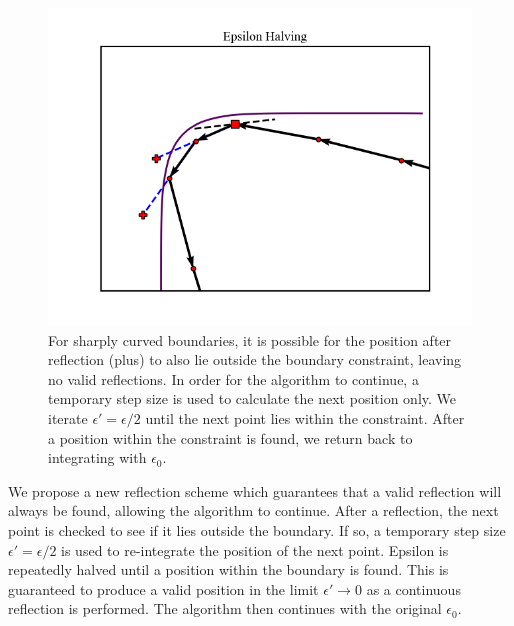 \documentclass[11pt]{article}
\begin{document}
    \begin{figure}[h!]
        \center
        \includegraphics[width=\linewidth]{../figures/EpsilonHalving}
        \caption{
        For sharply curved boundaries, it is possible for the position after reflection (plus) to also lie outside the boundary
        constraint, leaving no valid reflections.
        In order for the algorithm to continue, a temporary step size is used to calculate the next position only.
        We iterate $\epsilon' = \epsilon / 2$ until the next point lies within the constraint.
        After a position within the constraint is found, we return back to integrating with $\epsilon_0$.
        }\label{fig:epsilon_halving}
    \end{figure}

    We propose a new reflection scheme which guarantees that a valid reflection will always be found, allowing the
    algorithm to continue.
    After a reflection, the next point is checked to see if it lies outside the boundary.
    If so, a temporary step size $\epsilon' = \epsilon / 2$ is used to re-integrate the position of the next point.
    Epsilon is repeatedly halved until a position within the boundary is found.
    This is guaranteed to produce a valid position in the limit $\epsilon' \rightarrow 0$ as a continuous reflection
    is performed.
    The algorithm then continues with the original $\epsilon_0$. \\
\end{document}
